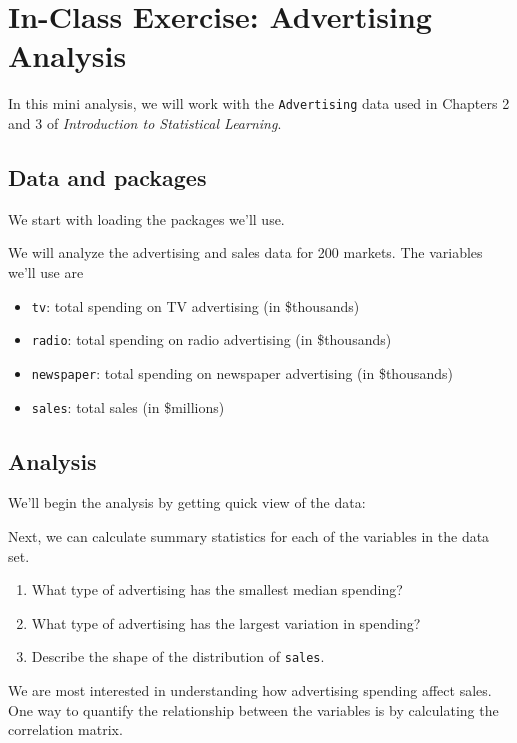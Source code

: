 \documentclass[]{book}
\providecommand{\tightlist}{%
  \setlength{\itemsep}{0pt}\setlength{\parskip}{0pt}}
\begin{document}
\section{In-Class Exercise: Advertising
Analysis}\label{in-class-exercise-advertising-analysis}

In this mini analysis, we will work with the \texttt{Advertising} data
used in Chapters 2 and 3 of \emph{Introduction to Statistical Learning}.

\subsection{Data and packages}\label{data-and-packages}

We start with loading the packages we'll use.

We will analyze the advertising and sales data for 200 markets. The
variables we'll use are

\begin{itemize}
\tightlist
\item
  \texttt{tv}: total spending on TV advertising (in \$thousands)
\item
  \texttt{radio}: total spending on radio advertising (in \$thousands)
\item
  \texttt{newspaper}: total spending on newspaper advertising (in
  \$thousands)
\item
  \texttt{sales}: total sales (in \$millions)
\end{itemize}

\subsection{Analysis}\label{analysis}

We'll begin the analysis by getting quick view of the data:

Next, we can calculate summary statistics for each of the variables in
the data set.

\begin{enumerate}
\def\labelenumi{\arabic{enumi}.}
\item
  What type of advertising has the smallest median spending?
\item
  What type of advertising has the largest variation in spending?
\item
  Describe the shape of the distribution of \texttt{sales}.
\end{enumerate}

We are most interested in understanding how advertising spending affect
sales. One way to quantify the relationship between the variables is by
calculating the correlation matrix.
\end{document}
